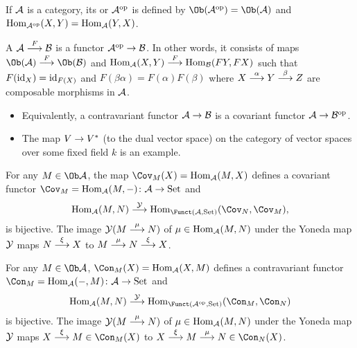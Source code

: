\documentclass[a4paper,parskip=half,numbers=enddot, DIV=12]{scrreprt}
\begin{document}
  \begin{defi}
  	\begin{alphanumerate}
  		\item If $\mathcal{A}$ is a category, its  or  $\mathcal{A}^{\mathrm{op}}$ is defined by  $\Ob(\Aa^\op) = \Ob(\Aa)$ and $\operatorname{Hom}_{\mathcal{A}^{\mathrm{op}}}(X,Y) = \operatorname{Hom}_{\mathcal{A}}(Y,X)$.
  		\item A  $\Aa\morphism[F]\Bb$ is a functor $\Aa^\op\morphism \Bb$. In other words, it consists of maps $\Ob(\Aa)\morphism[F]\Ob(\Bb)$ and $\Hom_\Aa(X,Y) \morphism[F] \Hom_\Bb(FY, FX)$ such that $F(\operatorname{id}_X) = \operatorname{id}_{F(X)}$ and $F(\beta\alpha)  = F(\alpha)F(\beta)$ where $X\morphism[\alpha]Y\morphism[\beta] Z$ are composable morphisms in $\mathcal{A}$.
  	\end{alphanumerate}
  \end{defi}
  \begin{rem*}
  	\begin{itemize}
  		\item 
  		Equivalently, a contravariant functor $\Aa\morphism \Bb$ is a covariant functor $\Aa\morphism \Bb^\op$.
  		\item
  		The map $V\morphism V^\ast$ (to the dual vector space) on the category of vector spaces over some fixed field $k$ is an example.
  	\end{itemize}
  \end{rem*}
  \begin{lem}
  	For any $M\in\Ob \Aa$, the map $\Cov_M(X) = \Hom_\Aa(M,X)$ defines a covariant functor $\Cov_M=\Hom_\Aa(M,-)\colon \Aa\morphism \cat{Set}$ and 
  	\begin{align*}
  	\Hom_\Aa(M,N) \morphism[\Yy] \Hom_{\Funct(\Aa,\cat{Set})} (\Cov_N, \Cov_M),
  	\end{align*}
  	is bijective. The image $\Yy(M\morphism[\mu]N)$ of $\mu\in\operatorname{Hom}_{\mathcal{A}}(M,N)$ under the Yoneda map $\mathcal{Y}$ maps $N\morphism[\xi]X$ to $M\morphism[\mu]N\morphism[\xi]X$.
  \end{lem}
  \begin{lem} 
  	For any $M\in\Ob \Aa$, $\Con_M(X) = \Hom_\Aa(X,M)$ defines a contravariant functor $\Con_M=\Hom_\Aa(-,M)\colon \Aa\morphism \cat{Set}$ and 
  	\begin{align*}
  	\Hom_\Aa(M,N) \morphism[\Yy] \Hom_{\Funct(\Aa^\op,\cat{Set})}(\Con_M,\Con_N)
  	\end{align*}
  	is bijective. The image $\Yy(M\morphism[\mu]N)$ of $\mu\in\operatorname{Hom}_{\mathcal{A}}(M,N)$ under the Yoneda map $\mathcal{Y}$ maps $X\morphism[\xi]M\in\Con_M(X)$ to $X\morphism[\xi]M\morphism[\mu]N\in\Con_N(X)$.
  \end{lem}
\end{document}
